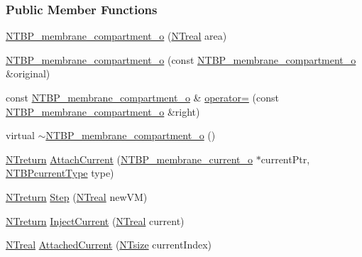 \subsubsection*{Public Member Functions}
\begin{DoxyCompactItemize}
\item 
\hyperlink{class_n_t_b_p__membrane__compartment__o_a2431f9191beef4c1995cd07c9ae58954}{NTBP\_\-membrane\_\-compartment\_\-o} (\hyperlink{nt__types_8h_a814a97893e9deb1eedcc7604529ba80d}{NTreal} area)
\item 
\hyperlink{class_n_t_b_p__membrane__compartment__o_ae24e765f011f896a92597352dcb00215}{NTBP\_\-membrane\_\-compartment\_\-o} (const \hyperlink{class_n_t_b_p__membrane__compartment__o}{NTBP\_\-membrane\_\-compartment\_\-o} \&original)
\item 
const \hyperlink{class_n_t_b_p__membrane__compartment__o}{NTBP\_\-membrane\_\-compartment\_\-o} \& \hyperlink{class_n_t_b_p__membrane__compartment__o_a96198a6d86db862e51476d2666cf71ed}{operator=} (const \hyperlink{class_n_t_b_p__membrane__compartment__o}{NTBP\_\-membrane\_\-compartment\_\-o} \&right)
\item 
virtual \hyperlink{class_n_t_b_p__membrane__compartment__o_a67c435a3f1b8432d36412e6fb9be2465}{$\sim$NTBP\_\-membrane\_\-compartment\_\-o} ()
\item 
\hyperlink{nt__types_8h_ab9564ee8f091e809d21b8451c6683c53}{NTreturn} \hyperlink{class_n_t_b_p__membrane__compartment__o_a5cd19eea286efe91a0438f16f2344d43}{AttachCurrent} (\hyperlink{class_n_t_b_p__membrane__current__o}{NTBP\_\-membrane\_\-current\_\-o} $\ast$currentPtr, \hyperlink{ntbp__object__obj_8h_a08c09fa5122ac3042638b8a9ada622d0}{NTBPcurrentType} type)
\item 
\hyperlink{nt__types_8h_ab9564ee8f091e809d21b8451c6683c53}{NTreturn} \hyperlink{class_n_t_b_p__membrane__compartment__o_a07367bb3d1df1c9f07a0b88fa8602be2}{Step} (\hyperlink{nt__types_8h_a814a97893e9deb1eedcc7604529ba80d}{NTreal} newVM)
\item 
\hyperlink{nt__types_8h_ab9564ee8f091e809d21b8451c6683c53}{NTreturn} \hyperlink{class_n_t_b_p__membrane__compartment__o_a735d5285f71539999730dee09ad6c7e9}{InjectCurrent} (\hyperlink{nt__types_8h_a814a97893e9deb1eedcc7604529ba80d}{NTreal} current)
\item 
\hyperlink{nt__types_8h_a814a97893e9deb1eedcc7604529ba80d}{NTreal} \hyperlink{class_n_t_b_p__membrane__compartment__o_a9441101291c5337917023121b6644a72}{AttachedCurrent} (\hyperlink{nt__types_8h_a06c124f2e4469769b58230253ce0560b}{NTsize} currentIndex)

\end{DoxyCompactItemize}
